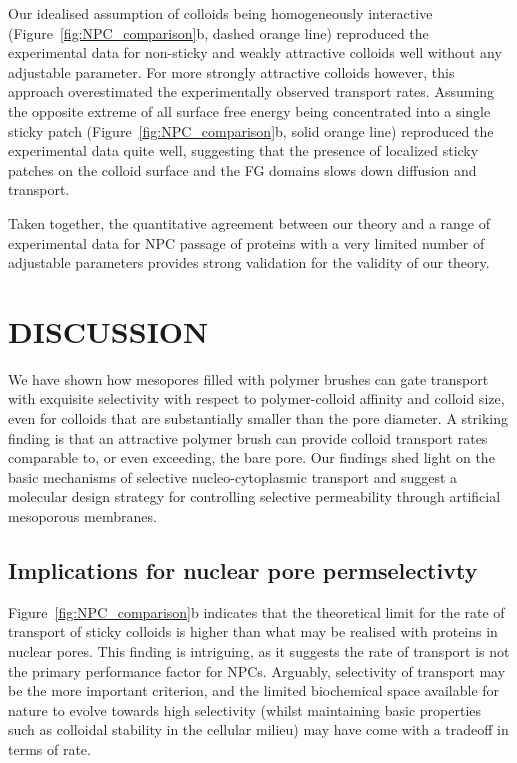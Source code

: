 \documentclass[12pt, a4paper]{article}
\begin{document}
Our idealised assumption of colloids being homogeneously interactive (Figure~\ref{fig:NPC_comparison}b, dashed orange line) reproduced the experimental data for non-sticky and weakly attractive colloids well without any adjustable parameter.
For more strongly attractive colloids however, this approach overestimated the experimentally observed transport rates.
Assuming the opposite extreme of all surface free energy being concentrated into a single sticky patch (Figure~\ref{fig:NPC_comparison}b, solid orange line) reproduced the experimental data quite well, suggesting that the presence of localized sticky patches on the colloid surface and the FG domains slows down diffusion and transport.

Taken together, the quantitative agreement between our theory and a range of experimental data for NPC passage of proteins with a very limited number of adjustable parameters provides strong validation for the validity of our theory.


\section{DISCUSSION}

We have shown how mesopores filled with polymer brushes can gate transport with exquisite selectivity with respect to polymer-colloid affinity and colloid size, even for colloids that are substantially smaller than the pore diameter.
A striking finding is that an attractive polymer brush can provide colloid transport rates comparable to, or even exceeding, the bare pore.
Our findings shed light on the basic mechanisms of selective nucleo-cytoplasmic transport and suggest a molecular design strategy for controlling selective permeability through artificial mesoporous membranes.


\subsection{Implications for nuclear pore permselectivty}

Figure~\ref{fig:NPC_comparison}b indicates that the theoretical limit for the rate of transport of sticky colloids is higher than what may be realised with proteins in nuclear pores.
This finding is intriguing, as it suggests the rate of transport is not the primary performance factor for NPCs.
Arguably, selectivity of transport may be the more important criterion, and the limited biochemical space available for nature to evolve towards high selectivity (whilst maintaining basic properties such as colloidal stability in the cellular milieu) may have come with a tradeoff in terms of rate.
\end{document}
